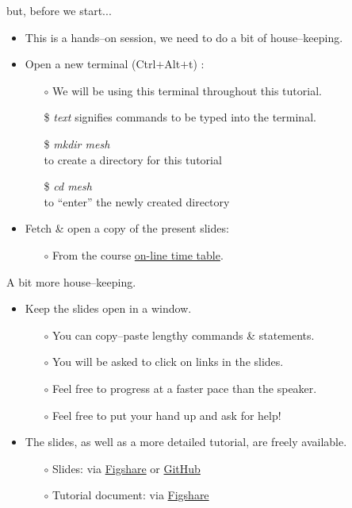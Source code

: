 \documentclass[t]{beamer}
\begin{document}
\begin{frame}{but, before we start...}
  \begin{itemize}
      \item This is a hands--on session, we need to do a bit of house--keeping.
      \vspace{10pt}
      \item Open a new terminal (Ctrl$+$Alt$+$t) :
      \begin{itemize}
         \item[$\circ$] We will be using this terminal throughout this tutorial.
         \item[\$] \emph{text} signifies commands to be typed into the terminal.
         \item[\$] \emph{mkdir mesh} \\to create a directory for this tutorial
         \item[\$] \emph{cd mesh} \\to ``enter'' the newly created directory
      \end{itemize}
      \vspace{10pt}
      \item Fetch \& open a copy of the present slides:
      \begin{itemize}
         \item[$\circ$] From the course \href{https://fluidityproject.github.io/DocumentationSupport/TrainingWorkshop/index.html}{on-line time table}.
      \end{itemize}
  \end{itemize}
\end{frame}

\begin{frame}{A bit more house--keeping.}
  \begin{itemize}
     \item Keep the slides open in a window.
     \begin{itemize}
         \item[$\circ$] You can copy--paste lengthy commands \& statements.
         \item[$\circ$] You will be asked to click on links in the slides.
         \item[$\circ$] Feel free to progress at a faster pace than the speaker.
         \item[$\circ$] Feel free to put your hand up and ask for help!
     \end{itemize}
     \vspace{10pt}
     \item The slides, as well as a more detailed tutorial, are freely available.\\
     \begin{itemize}
         \item[$\circ$] Slides: via \href{http://figshare.com/s/0dbd16a2635b11e4a71206ec4b8d1f61}{Figshare} or \href{http://fluidityproject.github.io/training/}{GitHub}
         \item[$\circ$] Tutorial document: via \href{http://figshare.com/s/16b14b6c650811e483cb06ec4bbcf141}{Figshare}
     \end{itemize}
  \end{itemize}
\end{frame}
\end{document}
